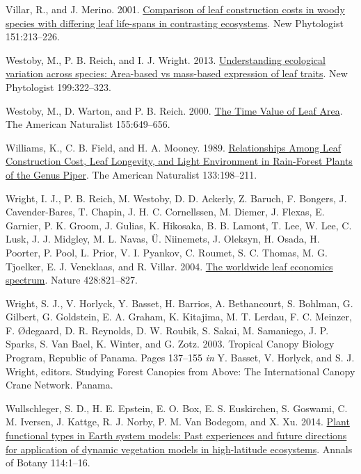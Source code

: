 \documentclass[
  12pt,
  letterpaper,
  DIV=11,
  numbers=noendperiod]{scrartcl}
\newlength{\cslhangindent}
\newlength{\cslentryspacingunit} %
\newenvironment{CSLReferences}[2] %
 {%
  \setlength{\parindent}{0pt}
  \ifodd #1
  \let\oldpar\par
  \def\par{\hangindent=\cslhangindent\oldpar}
  \fi
  \setlength{\parskip}{#2\cslentryspacingunit}
 }%
 {}
\begin{document}
\begin{CSLReferences}{1}{0}
\leavevmode{}%
Villar, R., and J. Merino. 2001.
\href{https://doi.org/10.1046/j.1469-8137.2001.00147.x}{Comparison of
leaf construction costs in woody species with differing leaf life-spans
in contrasting ecosystems}. New Phytologist 151:213--226.

\leavevmode{}%
Westoby, M., P. B. Reich, and I. J. Wright. 2013.
\href{https://doi.org/10.1111/nph.12345}{Understanding ecological
variation across species: {Area-based} vs mass-based expression of leaf
traits}. New Phytologist 199:322--323.

\leavevmode{}%
Westoby, M., D. Warton, and P. B. Reich. 2000.
\href{https://doi.org/10.1086/303346}{The {Time Value} of {Leaf Area}}.
The American Naturalist 155:649--656.

\leavevmode{}%
Williams, K., C. B. Field, and H. A. Mooney. 1989.
\href{https://doi.org/10.1086/284910}{Relationships {Among Leaf
Construction Cost}, {Leaf Longevity}, and {Light Environment} in
{Rain-Forest Plants} of the {Genus Piper}}. The American Naturalist
133:198--211.

\leavevmode{}%
Wright, I. J., P. B. Reich, M. Westoby, D. D. Ackerly, Z. Baruch, F.
Bongers, J. Cavender-Bares, T. Chapin, J. H. C. Cornellssen, M. Diemer,
J. Flexas, E. Garnier, P. K. Groom, J. Gulias, K. Hikosaka, B. B.
Lamont, T. Lee, W. Lee, C. Lusk, J. J. Midgley, M. L. Navas, Ü.
Niinemets, J. Oleksyn, H. Osada, H. Poorter, P. Pool, L. Prior, V. I.
Pyankov, C. Roumet, S. C. Thomas, M. G. Tjoelker, E. J. Veneklaas, and
R. Villar. 2004. \href{https://doi.org/10.1038/nature02403}{The
worldwide leaf economics spectrum}. Nature 428:821--827.

\leavevmode{}%
Wright, S. J., V. Horlyck, Y. Basset, H. Barrios, A. Bethancourt, S.
Bohlman, G. Gilbert, G. Goldstein, E. A. Graham, K. Kitajima, M. T.
Lerdau, F. C. Meinzer, F. Ødegaard, D. R. Reynolds, D. W. Roubik, S.
Sakai, M. Samaniego, J. P. Sparks, S. Van Bael, K. Winter, and G. Zotz.
2003. Tropical {Canopy Biology Program}, {Republic} of {Panama}. Pages
137--155 \emph{in} Y. Basset, V. Horlyck, and S. J. Wright, editors.
Studying {Forest Canopies} from {Above}: {The International Canopy Crane
Network}. {Panama}.

\leavevmode{}%
Wullschleger, S. D., H. E. Epstein, E. O. Box, E. S. Euskirchen, S.
Goswami, C. M. Iversen, J. Kattge, R. J. Norby, P. M. Van Bodegom, and
X. Xu. 2014. \href{https://doi.org/10.1093/aob/mcu077}{Plant functional
types in {Earth} system models: {Past} experiences and future directions
for application of dynamic vegetation models in high-latitude
ecosystems}. Annals of Botany 114:1--16.


\end{CSLReferences}
\end{document}

